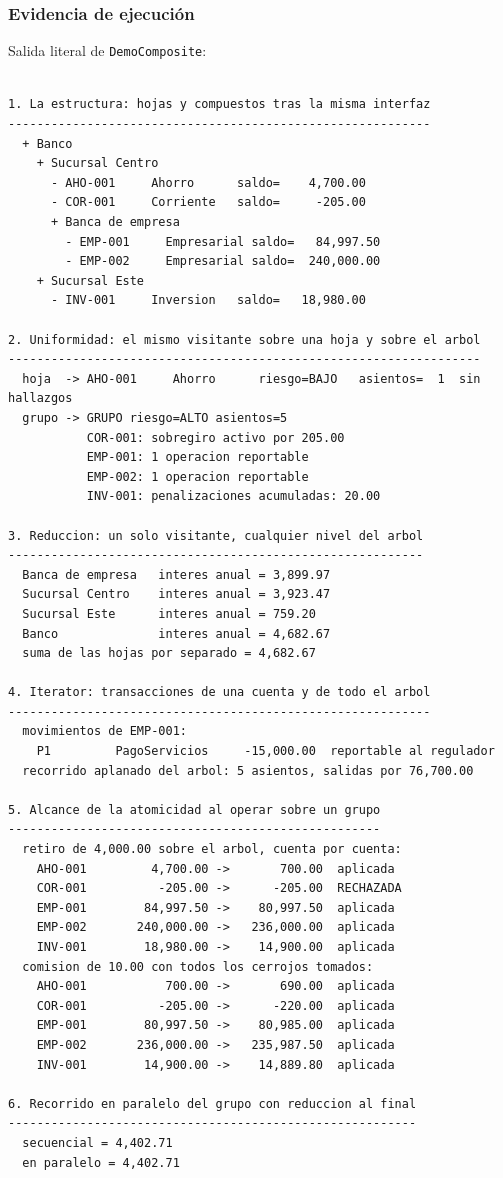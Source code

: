 \subsubsection*{Evidencia de ejecución}

Salida literal de \texttt{DemoComposite}:

{\small
\begin{verbatim}

1. La estructura: hojas y compuestos tras la misma interfaz
-----------------------------------------------------------
  + Banco
    + Sucursal Centro
      - AHO-001     Ahorro      saldo=    4,700.00
      - COR-001     Corriente   saldo=     -205.00
      + Banca de empresa
        - EMP-001     Empresarial saldo=   84,997.50
        - EMP-002     Empresarial saldo=  240,000.00
    + Sucursal Este
      - INV-001     Inversion   saldo=   18,980.00

2. Uniformidad: el mismo visitante sobre una hoja y sobre el arbol
------------------------------------------------------------------
  hoja  -> AHO-001     Ahorro      riesgo=BAJO   asientos=  1  sin hallazgos
  grupo -> GRUPO riesgo=ALTO asientos=5
           COR-001: sobregiro activo por 205.00
           EMP-001: 1 operacion reportable
           EMP-002: 1 operacion reportable
           INV-001: penalizaciones acumuladas: 20.00

3. Reduccion: un solo visitante, cualquier nivel del arbol
----------------------------------------------------------
  Banca de empresa   interes anual = 3,899.97
  Sucursal Centro    interes anual = 3,923.47
  Sucursal Este      interes anual = 759.20
  Banco              interes anual = 4,682.67
  suma de las hojas por separado = 4,682.67

4. Iterator: transacciones de una cuenta y de todo el arbol
-----------------------------------------------------------
  movimientos de EMP-001:
    P1         PagoServicios     -15,000.00  reportable al regulador
  recorrido aplanado del arbol: 5 asientos, salidas por 76,700.00

5. Alcance de la atomicidad al operar sobre un grupo
----------------------------------------------------
  retiro de 4,000.00 sobre el arbol, cuenta por cuenta:
    AHO-001         4,700.00 ->       700.00  aplicada
    COR-001          -205.00 ->      -205.00  RECHAZADA
    EMP-001        84,997.50 ->    80,997.50  aplicada
    EMP-002       240,000.00 ->   236,000.00  aplicada
    INV-001        18,980.00 ->    14,900.00  aplicada
  comision de 10.00 con todos los cerrojos tomados:
    AHO-001           700.00 ->       690.00  aplicada
    COR-001          -205.00 ->      -220.00  aplicada
    EMP-001        80,997.50 ->    80,985.00  aplicada
    EMP-002       236,000.00 ->   235,987.50  aplicada
    INV-001        14,900.00 ->    14,889.80  aplicada

6. Recorrido en paralelo del grupo con reduccion al final
---------------------------------------------------------
  secuencial = 4,402.71
  en paralelo = 4,402.71
\end{verbatim}
}

